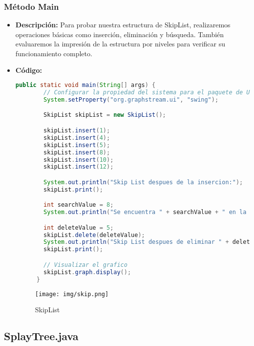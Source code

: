 \documentclass{article}
\begin{document}
  \subsubsection{Método Main}
  \begin{itemize}
    \item \textbf{Descripción: }Para probar nuestra estructura de SkipList, realizaremos operaciones básicas como inserción, 
    eliminación y búsqueda. También evaluaremos la impresión de la estructura por niveles para verificar su funcionamiento completo.

    \item \textbf{Código: }
    \begin{lstlisting}[language=Java, caption={Método Main}]
      public static void main(String[] args) {
        // Configurar la propiedad del sistema para el paquete de UI de GraphStream
        System.setProperty("org.graphstream.ui", "swing");

        SkipList skipList = new SkipList();

        skipList.insert(1);
        skipList.insert(4);
        skipList.insert(5);
        skipList.insert(8);
        skipList.insert(10);
        skipList.insert(12);

        System.out.println("Skip List despues de la insercion:");
        skipList.print();

        int searchValue = 8;
        System.out.println("Se encuentra " + searchValue + " en la Skip List? " + skipList.search(searchValue));

        int deleteValue = 5;
        skipList.delete(deleteValue);
        System.out.println("Skip List despues de eliminar " + deleteValue + ":");
        skipList.print();

        // Visualizar el grafico
        skipList.graph.display();
      }
    \end{lstlisting}
    \begin{figure}[H]
      \centering
      \texttt{[image: img/skip.png]}
      \caption{SkipList}
    \end{figure}
  \end{itemize}
  

  \subsection{SplayTree.java}
  
\end{document}
